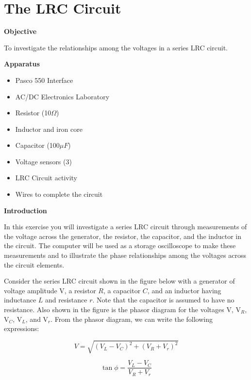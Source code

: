 
\section{The LRC Circuit}

\makelabheader %

\textbf{Objective}

To investigate the relationships among the voltages in a series LRC
circuit.

\textbf{Apparatus} 

\begin{itemize}
\item Pasco 550 Interface
\item AC/DC Electronics Laboratory
\item Resistor (10$\Omega$)
\item Inductor and iron core 
\item Capacitor (100$\mu F$)
\item Voltage sensors (3)
\item LRC Circuit activity
\item Wires to complete the circuit
\end{itemize}
\textbf{Introduction} 

In this exercise you will investigate a series LRC circuit through
measurements of the voltage across the generator, the resistor, the
capacitor, and the inductor in the circuit. The computer will be used
as a storage oscilloscope to make these measurements and to illustrate
the phase relationships among the voltages across the circuit elements.

Consider the series LRC circuit shown in the figure below with a generator
of voltage amplitude V, a resistor $R$, a capacitor $C$, and an inductor
having inductance $L$ and resistance $r$. Note that the capacitor is assumed
to have no resistance. Also shown in the figure is the phasor diagram
for the voltages V, V\( _{R} \), V\( _{C} \), V\( _{L} \), and
V\( _{r} \). From the phasor diagram, we can write the following
expressions:

\[
V=\sqrt{(V_{L}-V_{C})^{2}+(V_{R}+V_{r})^{2}}\]


\[
\tan \phi =\frac{V_{L}-V_{C}}{V_{R}+V_{r}}\]


\vspace{0.3cm}
{\centering {} \par}
\vspace{0.3cm}

